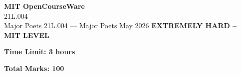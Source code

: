 \documentclass[12pt,a4paper]{exam}
\begin{document}
\begin{center}
{\LARGE \textbf{MIT OpenCourseWare}}\\21L.004\\Major Poets
\vspace{0.5cm}
{21L.004} --- {Major Poets}
\vspace{0.3cm}
May 2026
\vspace{0.3cm}
\textbf{EXTREMELY HARD -- MIT LEVEL}
\end{center}

\begin{center}
\textbf{Time Limit: 3 hours}
\end{center}

\begin{center}
\textbf{Total Marks: 100}
\end{center}

\vspace{0.5cm}
\end{document}
